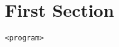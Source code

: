\documentclass{article}
\begin{document}
\section{First Section}
\begin{verbatim}
<program>
\end{verbatim}
\end{document}
